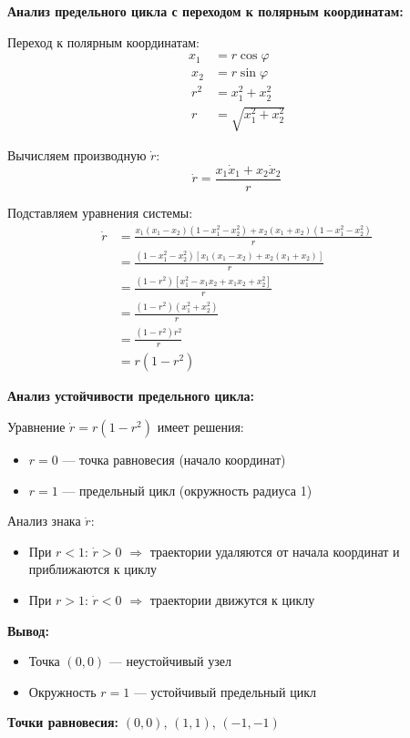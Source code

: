 \textbf{Анализ предельного цикла с переходом к полярным координатам:}

Переход к полярным координатам:
\begin{align}
x_1 &= r\cos\varphi \\\
x_2 &= r\sin\varphi \\\
r^2 &= x_1^2 + x_2^2 \\\
r &= \sqrt{x_1^2 + x_2^2}
\end{align}

Вычисляем производную $\dot{r}$:
$$\dot{r} = \frac{x_1\dot{x}_1 + x_2\dot{x}_2}{r}$$

Подставляем уравнения системы:
\begin{align}
\dot{r} &= \frac{x_1(x_1 - x_2)(1 - x_1^2 - x_2^2) + x_2(x_1 + x_2)(1 - x_1^2 - x_2^2)}{r} \\\
&= \frac{(1 - x_1^2 - x_2^2)[x_1(x_1 - x_2) + x_2(x_1 + x_2)]}{r} \\\
&= \frac{(1 - r^2)[x_1^2 - x_1x_2 + x_1x_2 + x_2^2]}{r} \\\
&= \frac{(1 - r^2)(x_1^2 + x_2^2)}{r} \\\
&= \frac{(1 - r^2)r^2}{r} \\\
&= r(1 - r^2)
\end{align}

\textbf{Анализ устойчивости предельного цикла:}

Уравнение $\dot{r} = r(1 - r^2)$ имеет решения:
\begin{itemize}
\item $r = 0$ --- точка равновесия (начало координат)
\item $r = 1$ --- предельный цикл (окружность радиуса 1)
\end{itemize}

Анализ знака $\dot{r}$:
\begin{itemize}
\item При $r < 1$: $\dot{r} > 0$ $\Rightarrow$ траектории удаляются от начала координат и приближаются к циклу
\item При $r > 1$: $\dot{r} < 0$ $\Rightarrow$ траектории движутся к циклу
\end{itemize}

\textbf{Вывод:}
\begin{itemize}
\item Точка $(0,0)$ --- неустойчивый узел
\item Окружность $r = 1$ --- устойчивый предельный цикл
\end{itemize}

\textbf{Точки равновесия:} $(0, 0)$, $(1, 1)$, $(-1, -1)$

